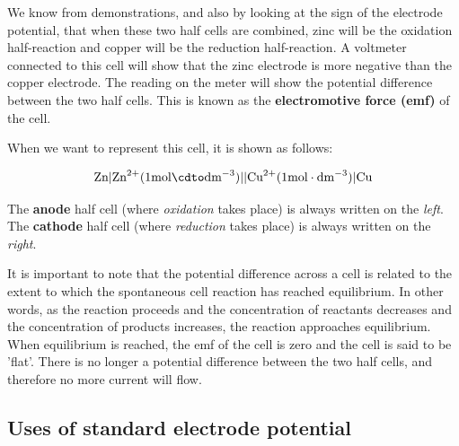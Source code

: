 We know from demonstrations, and also by looking at the sign of the electrode potential, that when these two half cells are combined, zinc will be the oxidation half-reaction and copper will be the reduction half-reaction. A voltmeter connected to this cell will show that the zinc electrode is more negative than the copper electrode. The reading on the meter will show the potential difference between the two half cells. This is known as the \textbf{electromotive force (emf)} of the cell.



When we want to represent this cell, it is shown as follows:

\begin{center}
\begin{equation*}
\text{Zn}|\text{Zn}^{2+} (1 \text{mol} \cdto \text{dm}^{-3})||\text{Cu}^{2+} (1 \text{mol} \cdot \text{dm}^{-3})|\text{Cu}
\end{equation*}
\end{center}

The \textbf{anode} half cell (where \textit{oxidation} takes place) is always written on the \textit{left}. The \textbf{cathode} half cell (where \textit{reduction} takes place) is always written on the \textit{right}.

It is important to note that the potential difference across a cell is related to the extent to which the spontaneous cell reaction has reached equilibrium. In other words, as the reaction proceeds and the concentration of reactants decreases and the concentration of products increases, the reaction approaches equilibrium. When equilibrium is reached, the emf of the cell is zero and the cell is said to be 'flat'. There is no longer a potential difference between the two half cells, and therefore no more current will flow. 

\subsection{Uses of standard electrode potential}
\label{subsec:electrochemical:uses of sep}

